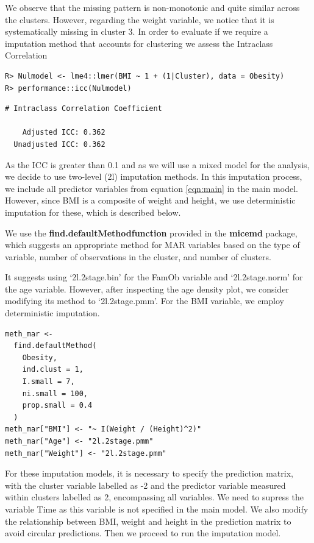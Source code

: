 \documentclass[
  article]{jss}
\begin{document}
We observe that the missing pattern is non-monotonic and quite similar
across the clusters. However, regarding the weight variable, we notice
that it is systematically missing in cluster 3. In order to evaluate if
we require a imputation method that accounts for clustering we assess
the Intraclass Correlation

\begin{verbatim}
R> Nulmodel <- lme4::lmer(BMI ~ 1 + (1|Cluster), data = Obesity)
R> performance::icc(Nulmodel)
\end{verbatim}

\begin{verbatim}
# Intraclass Correlation Coefficient

    Adjusted ICC: 0.362
  Unadjusted ICC: 0.362
\end{verbatim}

As the ICC is greater than 0.1 and as we will use a mixed model for the
analysis, we decide to use two-level (2l) imputation methods. In this
imputation process, we include all predictor variables from equation
\ref{eqn:main} in the main model. However, since BMI is a composite of
weight and height, we use deterministic imputation for these, which is
described below.

We use the \textbf{find.defaultMethodfunction} provided in the
\textbf{micemd} package, which suggests an appropriate method for MAR
variables based on the type of variable, number of observations in the
cluster, and number of clusters.

It suggests using `2l.2stage.bin' for the FamOb variable and
`2l.2stage.norm' for the age variable. However, after inspecting the age
density plot, we consider modifying its method to `2l.2stage.pmm'. For
the BMI variable, we employ deterministic imputation.

\begin{verbatim}
meth_mar <-
  find.defaultMethod(
    Obesity,
    ind.clust = 1,
    I.small = 7,
    ni.small = 100,
    prop.small = 0.4
  )
meth_mar["BMI"] <- "~ I(Weight / (Height)^2)"
meth_mar["Age"] <- "2l.2stage.pmm"
meth_mar["Weight"] <- "2l.2stage.pmm"
\end{verbatim}

For these imputation models, it is necessary to specify the prediction
matrix, with the cluster variable labelled as -2 and the predictor
variable measured within clusters labelled as 2, encompassing all
variables. We need to supress the variable Time as this variable is not
specified in the main model. We also modify the relationship between
BMI, weight and height in the prediction matrix to avoid circular
predictions. Then we proceed to run the imputation model.
\end{document}
